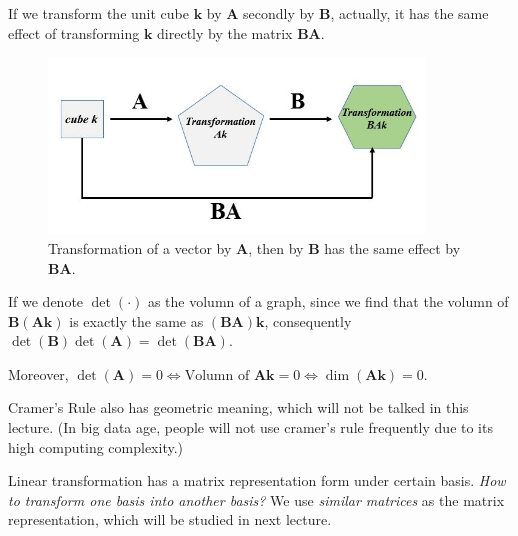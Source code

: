 If we transform the unit cube $\bm k$ by $\bm A$ secondly by $\bm B$, actually, it has the same effect of transforming $\bm k$ directly by the matrix $\bm{BA}$.
\begin{figure}[H]
\centering
\includegraphics[width=10cm]{week6/determinant}
\caption{Transformation of a vector by $\bm A$, then by $\bm B$ has the same effect by $\bm{BA}$.}
\end{figure}
If we denote $\det(\cdot)$ as the volumn of a graph, since we find that the volumn of $\bm B(\bm{Ak})$ is exactly the same as $(\bm{BA})\bm k$, consequently $\det(\bm B)\det(\bm A)=\det(\bm{BA})$.

Moreover, $\det(\bm A)=0\Longleftrightarrow
\text{Volumn of $\bm{Ak}=0$}\Longleftrightarrow
\dim(\bm{Ak})=0.$

Cramer's Rule also has geometric meaning, which will not be talked in this lecture. (In big data age, people will not use cramer's rule frequently due to its high computing complexity.)

Linear transformation has a matrix representation form under certain basis. \emph{How to transform one basis into another basis?} We use \textit{similar matrices} as the matrix representation, which will be studied in next lecture.
